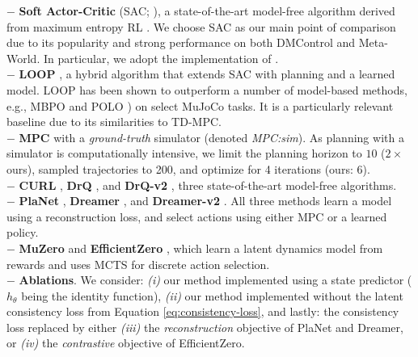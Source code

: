 \documentclass{article}
\begin{document}
$\boldsymbol{-}$ \textbf{Soft Actor-Critic} (SAC; \citep{Haarnoja2018SoftAA}), a state-of-the-art model-free algorithm derived from maximum entropy RL \citep{ziebart2008maximum}. We choose SAC as our main point of comparison due to its popularity and strong performance on both DMControl and Meta-World. In particular, we adopt the implementation of \citet{pytorch_sac}.\vspace{0.05in}\\
$\boldsymbol{-}$ \textbf{LOOP} \citep{Sikchi2020LearningOW}, a hybrid algorithm that extends SAC with planning and a learned model. LOOP has been shown to outperform a number of model-based methods, e.g., MBPO \citep{Janner2019WhenTT} and POLO \citep{Lowrey2019PlanOL}) on select MuJoCo tasks. It is a particularly relevant baseline due to its similarities to TD-MPC.\vspace{0.05in}\\
$\boldsymbol{-}$ \textbf{MPC} with a \textit{ground-truth} simulator (denoted \textit{MPC:sim}). As planning with a simulator is computationally intensive, we limit the planning horizon to $10$ ($2\times$ ours), sampled trajectories to 200, and optimize for 4 iterations (ours: 6).\vspace{0.05in}\\
$\boldsymbol{-}$ \textbf{CURL} \citep{srinivas2020curl}, \textbf{DrQ} \citep{kostrikov2020image}, and \textbf{DrQ-v2} \citep{yarats2021drqv2}, three state-of-the-art model-free algorithms.
\vspace{0.05in}\\
$\boldsymbol{-}$ \textbf{PlaNet} \citep{hafner2019planet}, \textbf{Dreamer} \citep{Hafner2020DreamTC}, and \textbf{Dreamer-v2} \citep{hafner2020dreamerv2}. All three methods learn a model using a reconstruction loss, and select actions using either MPC or a learned policy.\vspace{0.05in}\\
$\boldsymbol{-}$ \textbf{MuZero} \citep{Schrittwieser2020MasteringAG} and \textbf{EfficientZero} \citep{Ye2021MasteringAG}, which learn a latent dynamics model from rewards and uses MCTS for discrete action selection.\vspace{0.05in}\\
$\boldsymbol{-}$ \textbf{Ablations}. We consider: \textit{(i)} our method implemented using a state predictor ($h_{\theta}$ being the identity function), \textit{(ii)} our method implemented without the latent consistency loss from Equation \ref{eq:consistency-loss}, and lastly: the consistency loss replaced by either \textit{(iii)} the \emph{reconstruction} objective of PlaNet and Dreamer, or \textit{(iv)} the \emph{contrastive} objective of EfficientZero.
\end{document}
